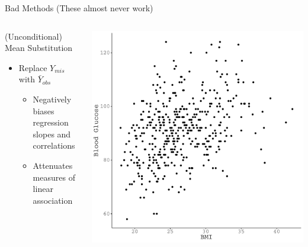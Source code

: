 \documentclass{beamer}\usepackage[]{graphicx}\usepackage[]{color}
\makeatletter
\def\maxwidth{ %
  \ifdim\Gin@nat@width>\linewidth
    \linewidth
  \else
    \Gin@nat@width
  \fi
}
\newenvironment{kframe}{%
 \def\at@end@of@kframe{}%
 \ifinner\ifhmode%
  \def\at@end@of@kframe{\end{minipage}}%
  \begin{minipage}{\columnwidth}%
 \fi\fi%
 \def\FrameCommand##1{\hskip\@totalleftmargin \hskip-\fboxsep
 \colorbox{shadecolor}{##1}\hskip-\fboxsep
     \hskip-\linewidth \hskip-\@totalleftmargin \hskip\columnwidth}%
 \MakeFramed {\advance\hsize-\width
   \@totalleftmargin\z@ \linewidth\hsize
   \@setminipage}}%
 {\par\unskip\endMakeFramed%
 \at@end@of@kframe}
\newenvironment{knitrout}{}{} %
\makeatother
\begin{document}
\begin{frame}{Bad Methods (These almost never work)}
  
  \begin{columns}
    \begin{column}{0.5\textwidth}
      
      (Unconditional) Mean Substitution
      \begin{itemize}
      \item Replace $Y_{mis}$ with $\bar{Y}_{obs}$
        \begin{itemize}
        \item Negatively biases regression slopes and correlations
        \item Attenuates measures of linear association
        \end{itemize}
      \end{itemize}
      
    \end{column}
    \begin{column}{0.5\textwidth}
      
\begin{knitrout}\footnotesize
{}\color{fgcolor}\begin{kframe}


{\ttfamily\noindent\bfseries{}}

{\ttfamily\noindent\bfseries\color{errorcolor}{Error in eval(expr, envir, enclos): object 'dat2' not found}}

{\ttfamily\noindent\bfseries\color{errorcolor}{Error in eval(expr, envir, enclos): object 'dat2' not found}}\end{kframe}

{\centering \includegraphics[width=\maxwidth]{figure/intro-unnamed-chunk-20-1} 

}
\end{knitrout}
\end{column}
\end{columns}
\end{frame}
\end{document}
